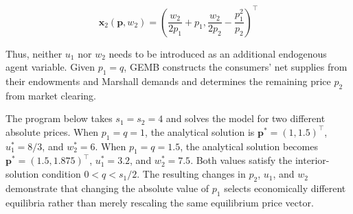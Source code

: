 \documentclass[
  letterpaper,
  DIV=11,
  numbers=noendperiod]{scrreprt}
\begin{document}
\[
\mathbf x_2(\mathbf p,w_2)
=
\left(
\frac{w_2}{2p_1}+p_1,
\frac{w_2}{2p_2}-\frac{p_1^2}{p_2}
\right)^\top
\]

Thus, neither \(u_1\) nor \(w_2\) needs to be introduced as an
additional endogenous agent variable. Given \(p_1=q\), GEMB constructs
the consumers' net supplies from their endowments and Marshall demands
and determines the remaining price \(p_2\) from market clearing.

The program below takes \(s_1=s_2=4\) and solves the model for two
different absolute prices. When \(p_1=q=1\), the analytical solution is
\(\mathbf p^*=(1,1.5)^\top\), \(u_1^*=8/3\), and \(w_2^*=6\). When
\(p_1=q=1.5\), the analytical solution becomes
\(\mathbf p^*=(1.5,1.875)^\top\), \(u_1^*=3.2\), and \(w_2^*=7.5\). Both
values satisfy the interior-solution condition \(0<q<s_1/2\). The
resulting changes in \(p_2\), \(u_1\), and \(w_2\) demonstrate that
changing the absolute value of \(p_1\) selects economically different
equilibria rather than merely rescaling the same equilibrium price
vector.
\end{document}
